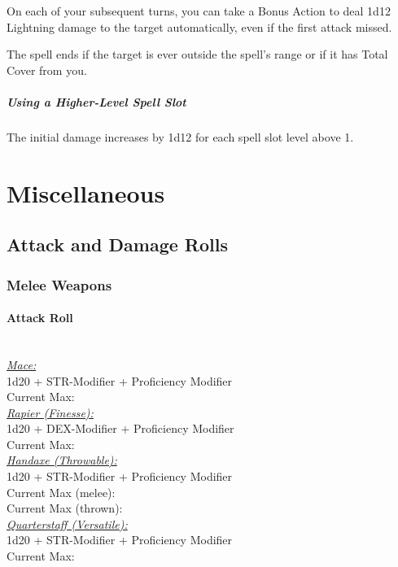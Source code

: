 \documentclass[letterpaper,openany,oneside,twocolumn]{book}
\begin{document}
On each of your subsequent turns, you can take a Bonus Action to deal 1d12 Lightning damage to the target automatically, even if the first attack missed.

The spell ends if the target is ever outside the spell's range or if it has Total Cover from you.

\subparagraph*{Using a Higher-Level Spell Slot} The initial damage increases by 1d12 for each spell slot level above 1.
\clearpage
\section*{Miscellaneous}
\subsection*{Attack and Damage Rolls}
\subsubsection*{Melee Weapons}
\paragraph*{Attack Roll}\hfill\\
\underline{\textit{Mace:}}\\
1d20 + STR-Modifier + Proficiency Modifier\\
\indent Current Max: 
\\
\underline{\textit{Rapier (Finesse):}}\\
1d20 + DEX-Modifier + Proficiency Modifier\\
\indent Current Max: 
\\
\underline{\textit{Handaxe (Throwable):}}\\
1d20 + STR-Modifier + Proficiency Modifier\\
\indent Current Max (melee): \\
\indent Current Max (thrown): 
\\
\underline{\textit{Quarterstaff (Versatile):}}\\
1d20 + STR-Modifier + Proficiency Modifier\\
\indent Current Max: 
\end{document}
